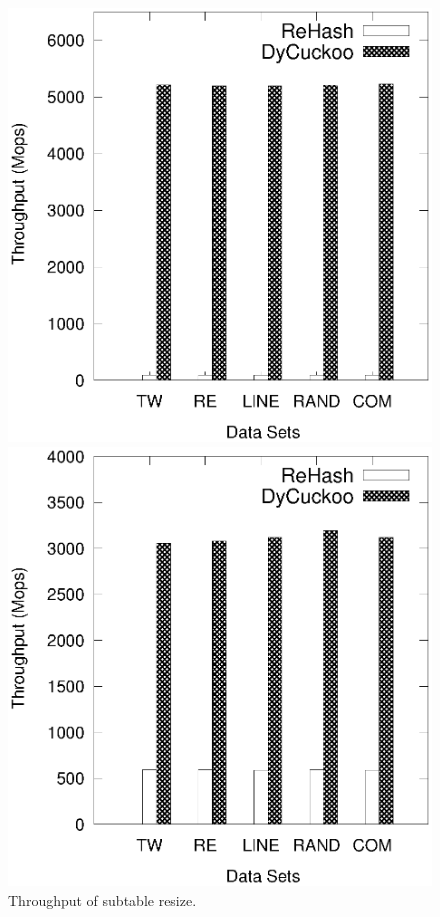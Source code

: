 \begin{figure}[t]
	\begin{minipage}{0.48\linewidth}\centering
		\includegraphics[width=\linewidth]{pic/compare/upsize.eps}
		\centerline{}
	\end{minipage}
	\hfill
	\begin{minipage}{0.48\linewidth}\centering
		\includegraphics[width=\linewidth]{pic/compare/downsize.eps}
		\centerline{}
	\end{minipage}
	\caption{Throughput of subtable resize.}
	\label{fig:resize}
\end{figure}

